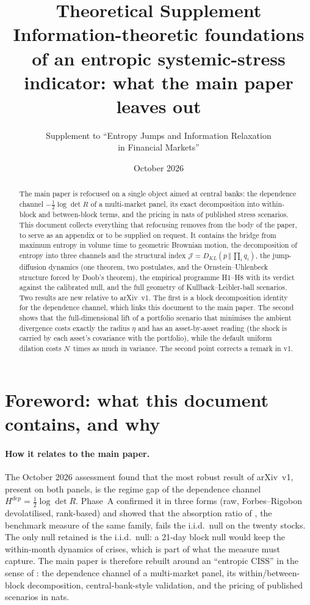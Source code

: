 \documentclass[11pt]{article}
\title{Theoretical Supplement\\[4pt]
\large Information-theoretic foundations of an entropic systemic-stress\\indicator: what the main paper leaves out}
\author{Supplement to ``Entropy Jumps and Information Relaxation\\in Financial Markets''}
\date{October 2026}
\theoremstyle{definition}
\theoremstyle{remark}
\newcommand{\JJ}{\mathcal{J}}
\newcommand{\KL}[2]{D_{KL}\!\left(#1\,\Vert\,#2\right)}
\begin{document}
\maketitle

\begin{abstract}
\noindent The main paper is refocused on a single object aimed at central banks:
the dependence channel $-\tfrac12\log\det R$ of a multi-market panel, its exact
decomposition into within-block and between-block terms, and the pricing in
nats of published stress scenarios. This document collects everything that
refocusing removes from the body of the paper, to serve as an appendix or to be
supplied on request. It contains the bridge from maximum entropy in volume time
to geometric Brownian motion, the decomposition of entropy into three channels
and the structural index $\JJ=\KL{p}{\prod_i q_i}$, the jump-diffusion dynamics
(one theorem, two postulates, and the Ornstein--Uhlenbeck structure forced by
Doob's theorem), the empirical programme H1--H8 with its verdict against the
calibrated null, and the full geometry of Kullback--Leibler-ball scenarios. Two
results are new relative to arXiv~v1. The first is a block decomposition
identity for the dependence channel, which links this document to the main
paper. The second shows that the full-dimensional lift of a portfolio scenario
that minimises the ambient divergence costs exactly the radius $\eta$ and has an
asset-by-asset reading (the shock is carried by each asset's covariance with
the portfolio), while the default uniform dilation costs $N$~times as much in
variance. The second point corrects a remark in v1.
\end{abstract}

\tableofcontents

\section*{Foreword: what this document contains, and why}

\paragraph{How it relates to the main paper.} The October 2026 assessment found
that the most robust result of arXiv~v1, present on both panels, is the
regime gap of the dependence channel $H^{dep}=\tfrac12\log\det R$. Phase~A
confirmed it in three forms (raw, Forbes--Rigobon devolatilised, rank-based) and
showed that the absorption ratio of \citet{kritzman2011}, the benchmark measure
of the same family, fails the i.i.d.\ null on the twenty stocks. The only null
retained is the i.i.d.\ null: a 21-day block null would keep the within-month
dynamics of crises, which is part of what the measure must capture. The main paper is
therefore rebuilt around an ``entropic CISS'' in the sense of
\citet{hollo2012}: the dependence channel of a multi-market panel, its
within/between-block decomposition, central-bank-style validation, and the
pricing of published scenarios in nats.
\end{document}
